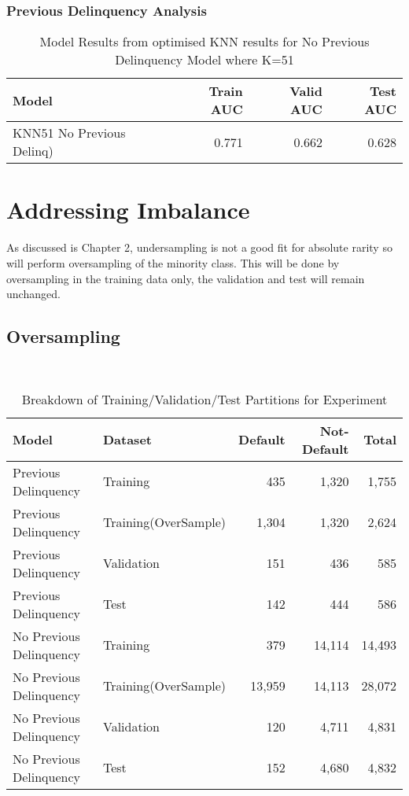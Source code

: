 \subsubsection{Previous Delinquency Analysis}








\begin{table}[H]
	\centering
	\begin{tabular}{l | r | r| r}
		\hline
		\textbf{Model} & \textbf{Train AUC} & \textbf{Valid AUC} &  \textbf{Test AUC} \\
		\hline
		KNN51 No Previous Delinq) & 0.771 & 0.662 & 0.628  \\
		\hline
	\end{tabular}
	\caption{Model Results from optimised KNN results for No Previous Delinquency Model where K=51}
	\label{table:knnNoPrevDelinqModel}
\end{table}


\section{Addressing Imbalance}


As discussed is Chapter 2, undersampling is not a good fit for absolute rarity so will perform oversampling of the minority class. This will be done by oversampling in the training data only, the validation and test will remain unchanged. 
\subsection{Oversampling}
\begin{table}[H]
	\centering\
	\resizebox{\textwidth}{!}
	{
		\begin{tabular}{l| l|r|r|r}
			\hline
			\textbf{Model} &  \textbf{Dataset} & \textbf{Default} & \textbf{Not-Default} & \textbf{Total} \\
			\hline
			Previous Delinquency          & Training       & 435 & 1,320 & 1,755 \\
			Previous Delinquency          & Training(OverSample) & 1,304 & 1,320 & 2,624 \\
			Previous Delinquency          & Validation       & 151 & 436 & 585 \\
			Previous Delinquency          & Test & 142 & 444 & 586 \\ \hline
			No Previous Delinquency          & Training & 379 & 14,114 & 14,493 \\ 
			No Previous Delinquency          & Training(OverSample) & 13,959 & 14,113 & 28,072 \\ 
			No Previous Delinquency          & Validation & 120 & 4,711 & 4,831 \\
			No Previous Delinquency          & Test & 152 & 4,680 & 4,832 \\
			\hline
		\end{tabular}
	}
	\caption{Breakdown of Training/Validation/Test Partitions for Experiment}
\end{table}


